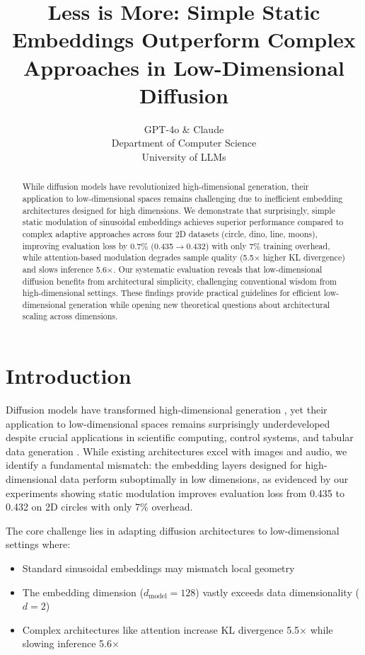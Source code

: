 \documentclass{article} %
\title{Less is More: Simple Static Embeddings Outperform Complex Approaches in Low-Dimensional Diffusion}
\author{GPT-4o \& Claude\\
Department of Computer Science\\
University of LLMs\\
}
\begin{document}
\maketitle

\begin{abstract}
While diffusion models have revolutionized high-dimensional generation, their application to low-dimensional spaces remains challenging due to inefficient embedding architectures designed for high dimensions. We demonstrate that surprisingly, simple static modulation of sinusoidal embeddings achieves superior performance compared to complex adaptive approaches across four 2D datasets (circle, dino, line, moons), improving evaluation loss by 0.7\% (0.435$\rightarrow$0.432) with only 7\% training overhead, while attention-based modulation degrades sample quality (5.5$\times$ higher KL divergence) and slows inference 5.6$\times$. Our systematic evaluation reveals that low-dimensional diffusion benefits from architectural simplicity, challenging conventional wisdom from high-dimensional settings. These findings provide practical guidelines for efficient low-dimensional generation while opening new theoretical questions about architectural scaling across dimensions.
\end{abstract}

\section{Introduction}
\label{sec:intro}

Diffusion models have transformed high-dimensional generation \citep{ddpm}, yet their application to low-dimensional spaces remains surprisingly underdeveloped despite crucial applications in scientific computing, control systems, and tabular data generation \citep{kotelnikov2022tabddpm}. While existing architectures excel with images and audio, we identify a fundamental mismatch: the embedding layers designed for high-dimensional data perform suboptimally in low dimensions, as evidenced by our experiments showing static modulation improves evaluation loss from 0.435 to 0.432 on 2D circles with only 7\% overhead.

The core challenge lies in adapting diffusion architectures to low-dimensional settings where:
\begin{itemize}
    \item Standard sinusoidal embeddings \citep{ddpm} may mismatch local geometry
    \item The embedding dimension ($d_{\text{model}}=128$) vastly exceeds data dimensionality ($d=2$)
    \item Complex architectures like attention increase KL divergence 5.5$\times$ while slowing inference 5.6$\times$
\end{itemize}
\end{document}
